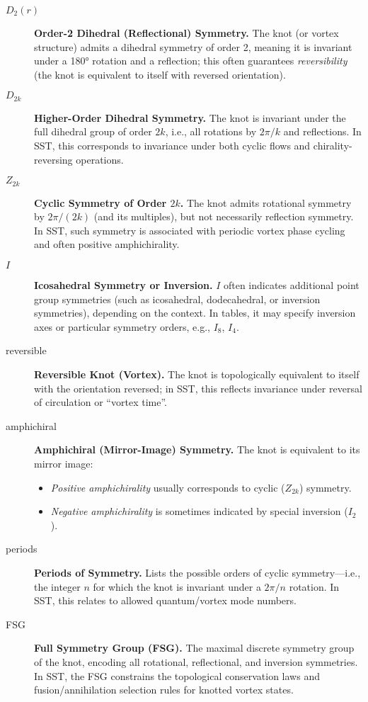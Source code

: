 \documentclass{article}
\begin{document}
\begin{description}
    \item[\( D_2(r) \)] \textbf{Order-2 Dihedral (Reflectional) Symmetry.}
    The knot (or vortex structure) admits a dihedral symmetry of order 2, meaning it is invariant under a 180° rotation and a reflection; this often guarantees \emph{reversibility} (the knot is equivalent to itself with reversed orientation).

    \item[\( D_{2k} \)] \textbf{Higher-Order Dihedral Symmetry.}
    The knot is invariant under the full dihedral group of order \( 2k \), i.e., all rotations by \( 2\pi/k \) and reflections. In SST, this corresponds to invariance under both cyclic flows and chirality-reversing operations.

    \item[\( Z_{2k} \)] \textbf{Cyclic Symmetry of Order \( 2k \).}
    The knot admits rotational symmetry by \( 2\pi/(2k) \) (and its multiples), but not necessarily reflection symmetry. In SST, such symmetry is associated with periodic vortex phase cycling and often positive amphichirality.

    \item[\( I \)] \textbf{Icosahedral Symmetry or Inversion.}
    \( I \) often indicates additional point group symmetries (such as icosahedral, dodecahedral, or inversion symmetries), depending on the context. In tables, it may specify inversion axes or particular symmetry orders, e.g., \( I_8 \), \( I_4 \).

    \item[reversible] \textbf{Reversible Knot (Vortex).}
    The knot is topologically equivalent to itself with the orientation reversed; in SST, this reflects invariance under reversal of circulation or “vortex time”.

    \item[amphichiral] \textbf{Amphichiral (Mirror-Image) Symmetry.}
    The knot is equivalent to its mirror image:
    \begin{itemize}\item \emph{Positive amphichirality} usually corresponds to cyclic (\( Z_{2k} \)) symmetry.
    \item \emph{Negative amphichirality} is sometimes indicated by special inversion (\( I_2 \)).
    \end{itemize}
     
     
    \item[periods] \textbf{Periods of Symmetry.}
    Lists the possible orders of cyclic symmetry—i.e., the integer \( n \) for which the knot is invariant under a \( 2\pi/n \) rotation. In SST, this relates to allowed quantum/vortex mode numbers.

    \item[FSG] \textbf{Full Symmetry Group (FSG).}
    The maximal discrete symmetry group of the knot, encoding all rotational, reflectional, and inversion symmetries. In SST, the FSG constrains the topological conservation laws and fusion/annihilation selection rules for knotted vortex states.
\end{description}
\end{document}
